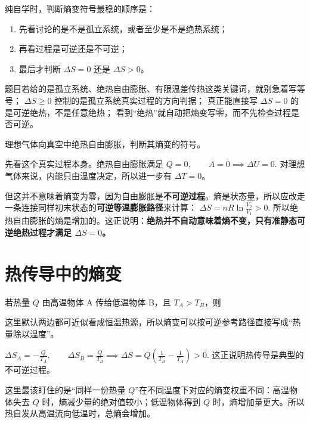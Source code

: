 \documentclass[lang=cn,11pt]{elegantbook}
\begin{document}
纯自学时，判断熵变符号最稳的顺序是：
\begin{enumerate}
 \item 先看讨论的是不是孤立系统，或者至少是不是绝热系统；
 \item 再看过程是可逆还是不可逆；
 \item 最后才判断 \(\Delta S=0\) 还是 \(\Delta S>0\)。
\end{enumerate}

\begin{note}
 题目若给的是孤立系统、绝热自由膨胀、有限温差传热这类关键词，就别急着写等号； \(\Delta S\ge 0\) 控制的是孤立系统真实过程的方向判据； 真正能直接写 \(\Delta S=0\) 的是可逆绝热，不是任意绝热； 看到“绝热”就自动把熵变写零，而不先检查过程是否可逆。
\end{note}

\begin{exercise}[绝热自由膨胀的熵变]
理想气体向真空中绝热自由膨胀，判断其熵变的符号。
\end{exercise}

\begin{solution}
先看这个真实过程本身。绝热自由膨胀满足
 \(Q=0,\qquad A=0 \implies \Delta U=0.\) 
对理想气体来说，内能只由温度决定，所以进一步有 \(\Delta T=0\)。

但这并不意味着熵变为零，因为自由膨胀是\textbf{不可逆过程}。熵是状态量，所以应改走一条连接同样初末状态的\textbf{可逆等温膨胀路径}来计算：
 \(\Delta S=nR\ln\frac{V_2}{V_1}>0.\) 
所以绝热自由膨胀的熵是增加的。这正说明：\textbf{绝热并不自动意味着熵不变，只有准静态可逆绝热过程才满足 \(\Delta S=0\)。}
\end{solution}

\section{热传导中的熵变}

若热量 \(Q\) 由高温物体 A 传给低温物体 B，且 \(T_A>T_B\)，则

这里默认两边都可近似看成恒温热源，所以熵变可以按可逆参考路径直接写成“热量除以温度”。

 \(\Delta S_A=-\frac{Q}{T_A},\qquad \Delta S_B=\frac{Q}{T_B} \implies \Delta S=Q\left(\frac{1}{T_B}-\frac{1}{T_A}\right)>0.\) 
这正说明热传导是典型的不可逆过程。

\begin{note}
这里最该盯住的是“同样一份热量 \(Q\)”在不同温度下对应的熵变权重不同：高温物体失去 \(Q\) 时，熵减少量的绝对值较小；低温物体得到 \(Q\) 时，熵增加量更大。所以热自发从高温流向低温时，总熵会增加。
\end{note}
\end{document}
